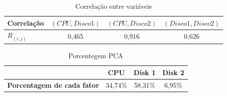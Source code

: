 \documentclass[11pt,a4paper,openany,oneside]{abntex2}
\begin{document}
\begin{table}[H]
	\centering
	\caption{Correlação entre variáveis} 
	\begin{tabular}{lccc}
		\toprule
		    Correlação & $(CPU,Disco 1)$ & $(CPU,Disco 2)$ & $(Disco 1,Disco 2)$\\
		\midrule
		$R_{(i,j)}$    & 0,465  & 0,916	& 0,626\\
		\bottomrule
	\end{tabular}%
	\label{tab:correlacao}%
\end{table}%

		





\begin{table}[h]
	\caption{Porcentegem PCA}
		\centering
	\begin{tabular}{|c|c|c|c|}
		\hline
		& \textbf{CPU} & \textbf{Disk 1} & \textbf{Disk 2} \\ \hline
		\hline
		\textbf{Porcentagem de cada fator} & 34,74\% & 58,31\% & 6,95\% \\ \hline
	\end{tabular}
	\label{porcentagenpca}
\end{table}
\end{document}
